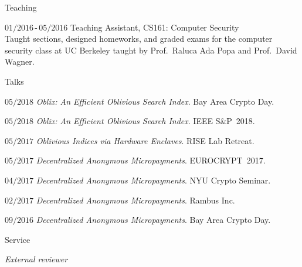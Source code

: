 \documentclass[11pt]{article}
\begin{document}
\begin{cv}{\vspace{-5em}}
    \small
    \begin{bibunit}[alpha]
      \nocite{MishraPCCP18}
    \putbib[pubs]
    \end{bibunit}
    \begin{bibunit}[alpha]
      \nocite{ChiesaGLMMM17}
    \putbib[pubs]
    \end{bibunit}
    \begin{bibunit}[alpha]
      \nocite{CarliniMVZSSWZ16}
    \putbib[pubs]
    \end{bibunit}
    \begin{bibunit}[alpha]
      \nocite{HoLMHSW16}
    \putbib[pubs]
    \end{bibunit}
    \begin{bibunit}[alpha]
      \nocite{PortnoffLEMLW15}
    \putbib[pubs]
    \end{bibunit}
  \begin{cvlist}{Teaching}
  \item[\small$01/2016$\,-\,$05/2016$] Teaching Assistant, \textsc{CS161}: Computer Security\\
    {\small
    Taught sections, designed homeworks, and graded exams for the computer security class at UC Berkeley taught by Prof.~Raluca Ada Popa and Prof.~David Wagner.}
  \end{cvlist}
  \begin{cvlist}{Talks}
    \small
    \item[\small$05/2018$] \emph{Oblix: An Efficient Oblivious Search Index}. Bay Area Crypto Day.
    \item[\small$05/2018$] \emph{Oblix: An Efficient Oblivious Search Index}. IEEE S\&P~2018.
    \item[\small$05/2017$] \emph{Oblivious Indices via Hardware Enclaves}. RISE Lab Retreat.
    \item[\small$05/2017$] \emph{Decentralized Anonymous Micropayments}. EUROCRYPT~2017.
    \item[\small$04/2017$] \emph{Decentralized Anonymous Micropayments}. NYU Crypto Seminar.
    \item[\small$02/2017$] \emph{Decentralized Anonymous Micropayments}. Rambus Inc.
    \item[\small$09/2016$] \emph{Decentralized Anonymous Micropayments}. Bay Area Crypto Day.
  \end{cvlist}
  \clearpage
  \begin{cvlist}{Service}
    \small
    \item[\emph{External reviewer}]

\end{cvlist}
\end{cv}
\end{document}
